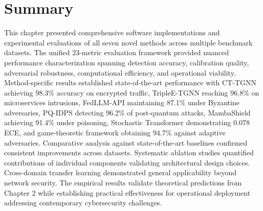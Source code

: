 \section{Summary}
\label{sec:impl_summary}

This chapter presented comprehensive software implementations and experimental evaluations of all seven novel methods across multiple benchmark datasets. The unified 23-metric evaluation framework provided nuanced performance characterization spanning detection accuracy, calibration quality, adversarial robustness, computational efficiency, and operational viability. Method-specific results established state-of-the-art performance with CT-TGNN achieving 98.3\% accuracy on encrypted traffic, TripleE-TGNN reaching 96.8\% on microservices intrusions, FedLLM-API maintaining 87.1\% under Byzantine adversaries, PQ-IDPS detecting 96.2\% of post-quantum attacks, MambaShield achieving 91.4\% under poisoning, Stochastic Transformer demonstrating 0.078 ECE, and game-theoretic framework obtaining 94.7\% against adaptive adversaries. Comparative analysis against state-of-the-art baselines confirmed consistent improvements across datasets. Systematic ablation studies quantified contributions of individual components validating architectural design choices. Cross-domain transfer learning demonstrated general applicability beyond network security. The empirical results validate theoretical predictions from Chapter 2 while establishing practical effectiveness for operational deployment addressing contemporary cybersecurity challenges.
